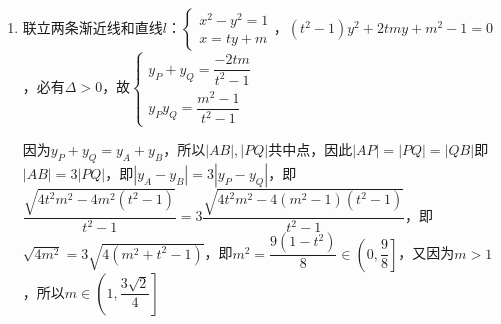 \begin{enumerate}
\begin{jieda}
\begin{enumerate}
            联立两条渐近线和直线$l$：$\left\{\begin{array}{l}
                x^2-y^2 = 0 \\
                x = ty+m
            \end{array} \right.$，$(t^2-1)y^2+2tmy+m^2 = 0$，必有$\Delta > 0$，故$\left\{\begin{array}{l}
                y_A + y_B = \dfrac{-2tm}{t^2-1} \\
                y_Ay_B = \dfrac{m^2}{t^2-1}
            \end{array}\right.$

            $S_{\triangle OAB} = S_{\triangle MOA} + S_{\triangle MOB} = \dfrac{m}{2} \cdot |y_A - y_B| = \dfrac{|m|}{2} \cdot \dfrac{\sqrt{4t^2m^2 - 4m^2(t^2-1)}}{t^2-1} = \dfrac{m^2}{1-t^2}$

            因为$l$过右焦点，所以$m = \sqrt{2}$，因此$S_{\triangle OAB} = \dfrac{2}{1-t^2} \geq 2$（$t = 0$）

            \item 联立两条渐近线和直线$l$：$\left\{\begin{array}{l}
                x^2-y^2 = 1 \\
                x = ty+m
            \end{array} \right.$，$(t^2-1)y^2+2tmy+m^2 - 1 = 0$，必有$\Delta > 0$，故$\left\{\begin{array}{l}
                y_P + y_Q = \dfrac{-2tm}{t^2-1} \\
                y_Py_Q = \dfrac{m^2-1}{t^2-1}
            \end{array}\right.$
            
            因为$y_P + y_Q = y_A + y_B$，所以$|AB|, |PQ|$共中点，因此$\left| {AP}\right|  = \left| {PQ}\right|  = \left| {QB}\right|$即$|AB| = 3|PQ|$，即$|y_A-y_B| = 3|y_P - y_Q|$，即$\dfrac{\sqrt{4t^2m^2 - 4m^2(t^2-1)}}{t^2-1} = 3\dfrac{\sqrt{4t^2m^2 - 4(m^2-1)(t^2-1)}}{t^2-1}$，即$\sqrt{4m^2}  = 3\sqrt{4(m^2+t^2-1)}$，即$m^2 = \dfrac{9(1-t^2)}{8} \in \left(0, \dfrac{9}{8}\right]$，又因为$m > 1$，所以$m \in \left(1, \dfrac{3\sqrt{2}}{4}\right]$
        \end{enumerate}
    \end{jieda}
    

\end{enumerate}
